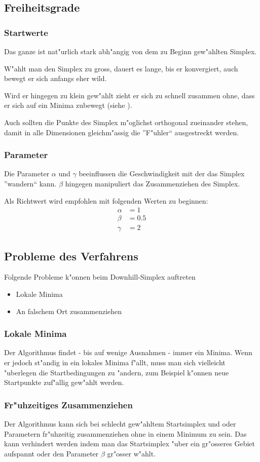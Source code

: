 \subsection{Freiheitsgrade}
\subsubsection{Startwerte}
Das ganze ist nat"urlich stark abh"angig von dem zu Beginn gew"ahlten Simplex.

W"ahlt man den Simplex zu gross, dauert es lange, bis er konvergiert, auch bewegt er sich anfangs eher wild.

Wird er hingegen zu klein gew"ahlt zieht er sich zu schnell zusammen ohne, dass er sich auf ein Minima zubewegt (siehe ).

Auch sollten die Punkte des Simplex m"oglichst orthogonal zueinander stehen, damit in alle Dimensionen gleichm"assig die ''F"uhler`` ausgestreckt werden.

\subsubsection{Parameter}
Die Parameter $\alpha$ und $\gamma$ beeinflussen die Geschwindigkeit mit der das Simplex ''wandern`` kann.
$\beta$ hingegen manipuliert das Zusammenziehen des Simplex.

Als Richtwert wird empfohlen mit folgenden Werten zu beginnen:
\begin{align*}
\alpha &= 1 \\
\beta &= 0.5 \\
\gamma &= 2
\end{align*}

\subsection{Probleme des Verfahrens}
Folgende Probleme k"onnen beim Downhill-Simplex auftreten
\begin{itemize}
\item Lokale Minima
\item An falschem Ort zusammenziehen
\end{itemize}

\subsubsection{Lokale Minima}
Der Algorithmus findet - bis auf wenige Ausnahmen - immer ein Minima. Wenn er jedoch st"andig in ein lokales Minima f"allt, muss man sich vielleicht "uberlegen die Startbedingungen zu "andern, 
zum Beispiel k"onnen neue Startpunkte zuf"allig gew"ahlt werden.

\subsubsection{Fr"uhzeitiges Zusammenziehen}
\label{sec:downhillZusammenziehen}
Der Algorithmus kann sich bei schlecht gew"ahltem Startsimplex und oder Parametern fr"uhzeitig zusammenziehen ohne in einem Minimum zu sein.
Das kann verhindert werden indem man das Startsimplex "uber ein gr"osseres Gebiet aufspannt oder den Parameter $\beta$ gr"osser w"ahlt.
